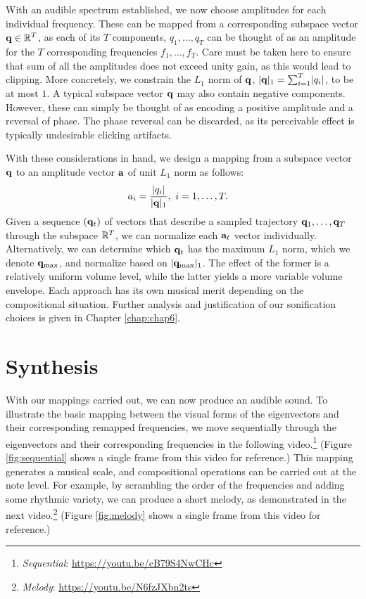 With an audible spectrum established, we now choose amplitudes for each individual frequency. These can be mapped from a corresponding subspace vector $\mathbf{q} \in \mathbb{R}^T$, as each of its $T$ components, $q_1, \ldots, q_T$ can be thought of as an amplitude for the $T$ corresponding frequencies $f_1, \ldots, f_T$. Care must be taken here to ensure that sum of all the amplitudes does not exceed unity gain, as this would lead to clipping. More concretely, we constrain the $L_1$ norm of $\mathbf{q}$, $\lvert\mathbf{q}\rvert_1 = \sum_{i=1}^{T}\lvert q_i \rvert$, to be at most $1$. A typical subspace vector $\mathbf{q}$ may also contain negative components. However, these can simply be thought of as encoding a positive amplitude and a reversal of phase. The phase reversal can be discarded, as its perceivable effect is typically undesirable clicking artifacts.

With these considerations in hand, we design a mapping from a subspace vector $\mathbf{q}$ to an amplitude vector $\mathbf{a}$ of unit $L_1$ norm as follows:
\begin{equation}
\begin{aligned}
a_i &= \frac{\lvert q_i \rvert}{\lvert\mathbf{q}\rvert_1}, \ i = 1, \ldots, T.
\end{aligned}
\end{equation}
Given a sequence $(\mathbf{q}_t)$ of vectors that describe a sampled trajectory $\mathbf{q}_1, \ldots, \mathbf{q}_T$ through the subspace $\mathbb{R}^T$, we can normalize each $\mathbf{a}_t$ vector individually. Alternatively, we can determine which $\mathbf{q}_t$ has the maximum $L_1$ norm, which we denote ${\mathbf{q}}_\textnormal{max}$, and normalize based on $\lvert\mathbf{q}_{\textnormal{max}}\rvert_1$. The effect of the former is a relatively uniform volume level, while the latter yields a more variable volume envelope. Each approach has its own musical merit depending on the compositional situation. Further analysis and justification of our sonification choices is given in Chapter \ref{chap:chap6}.

\section{Synthesis}

With our mappings carried out, we can now produce an audible sound. To illustrate the basic mapping between the visual forms of the eigenvectors and their corresponding remapped frequencies, we move sequentially through the eigenvectors and their corresponding frequencies in the following video.\footnote{{\em Sequential}:  \url{https://youtu.be/cB79S4NwCHc}} (Figure \ref{fig:sequential} shows a single frame from this video for reference.) This mapping generates a musical scale, and compositional operations can be carried out at the note level. For example, by scrambling the order of the frequencies and adding some rhythmic variety, we can produce a short melody, as demonstrated in the next video.\footnote{{\em Melody}: \url{https://youtu.be/N6fzJXbn2ts}} (Figure \ref{fig:melody} shows a single frame from this video for reference.)

